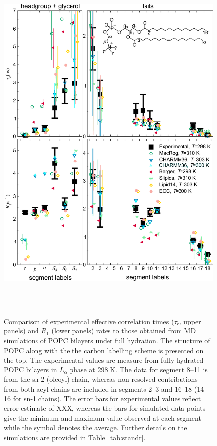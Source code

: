 \documentclass[journal=jpcbfk,manuscript=article,layout=twocolumn]{achemso}
\begin{document}
\begin{figure}[ht!]
\centering
\includegraphics[scale=0.46]{normalcond.pdf}
\caption{Comparison of experimental effective correlation times ($\tau_\mathrm{e}$, upper panels) and $R_{1}$ (lower panels) rates to those obtained from MD simulations of POPC bilayers under full hydration. The structure of POPC along with the the carbon labelling scheme is presented on the top. The experimental values are measure from fully hydrated POPC bilayers in $L_{\alpha}$ phase at 298 K. The data for 
segment 8--11 is from the sn-2 (oleoyl) chain, whereas non-resolved contributions from both acyl chains are included in segments 2--3 and 16--18 (14--16 for sn-1 chains). The error bars for experimental values reflect error estimate of XXX, whereas the 
bars for simulated data points give the minimum and maximum value observed at each segment while the symbol denotes the average. %
Further details on the simulations are provided in 
Table~\ref{tab:standr}.}
\label{fig:teff_R1}


 \\
 \\


\end{figure}
\end{document}
